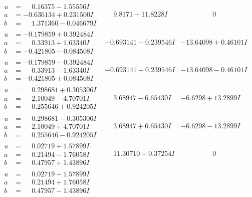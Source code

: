 \documentclass[1p]{elsarticle_modified}
\theoremstyle{definition}
\begin{document}
$$\begin{array}{c|c|c}
\begin{aligned}
u &= \phantom{-}0.16375 - 1.55556 I \\
a &= -0.636134 + 0.231500 I \\
b &= \phantom{-}1.371360 - 0.046679 I\end{aligned}
 & \phantom{-}9.8171 + 11.8228 I & \phantom{-0.000000 } 0 \\ \hline\begin{aligned}
u &= -0.179859 + 0.392484 I \\
a &= \phantom{-}0.33913 + 1.63340 I \\
b &= -0.421805 - 0.084508 I\end{aligned}
 & -0.693141 - 0.239546 I & -13.64098 + 0.46101 I \\ \hline\begin{aligned}
u &= -0.179859 - 0.392484 I \\
a &= \phantom{-}0.33913 - 1.63340 I \\
b &= -0.421805 + 0.084508 I\end{aligned}
 & -0.693141 + 0.239546 I & -13.64098 - 0.46101 I \\ \hline\begin{aligned}
u &= \phantom{-}0.298681 + 0.305306 I \\
a &= \phantom{-}2.10049 - 4.70701 I \\
b &= \phantom{-}0.255646 + 0.924205 I\end{aligned}
 & \phantom{-}3.68947 - 6.65430 I & -6.6298 + 13.2899 I \\ \hline\begin{aligned}
u &= \phantom{-}0.298681 - 0.305306 I \\
a &= \phantom{-}2.10049 + 4.70701 I \\
b &= \phantom{-}0.255646 - 0.924205 I\end{aligned}
 & \phantom{-}3.68947 + 6.65430 I & -6.6298 - 13.2899 I \\ \hline\begin{aligned}
u &= \phantom{-}0.02719 + 1.57899 I \\
a &= \phantom{-}0.21494 - 1.76058 I \\
b &= \phantom{-}0.47957 + 1.43896 I\end{aligned}
 & \phantom{-}11.30710 + 0.37254 I & \phantom{-0.000000 } 0 \\ \hline\begin{aligned}
u &= \phantom{-}0.02719 - 1.57899 I \\
a &= \phantom{-}0.21494 + 1.76058 I \\
b &= \phantom{-}0.47957 - 1.43896 I\end{aligned}

\end{array}$$
\end{document}
